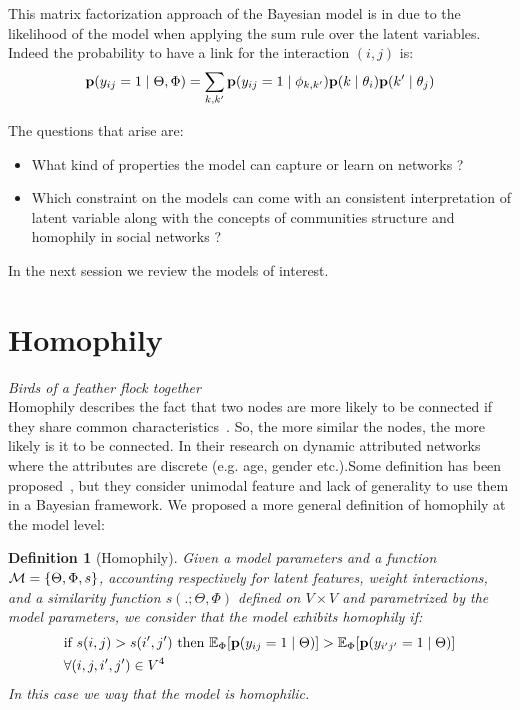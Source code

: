 \documentclass[a4paper, 12pt]{article}
\newtheorem{definition}{Definition}[section]
\begin{document}
This matrix factorization approach of the Bayesian model is in due to the likelihood of the model when applying the sum rule over the latent variables. Indeed the probability to have a link for the interaction $(i,j)$ is:
\begin{equation}
\mathbf{p}(y_{ij}=1 \mid \Theta, \Phi ) = \sum_{k, k'} \mathbf{p}(y_{ij}=1\mid\phi_{k,k'}) \mathbf{p}(k \mid\theta_i) \mathbf{p}(k' \mid \theta_j)
\end{equation}


The questions that arise are:
\begin{itemize}
	\item What kind of properties the model can capture or learn on networks ?
	\item Which constraint on the models can come with an consistent interpretation of latent variable along with the concepts of communities structure and homophily in social networks  ?
\end{itemize} 

In the next session we review the models of interest.

\section{Homophily}
\hspace{2em} \emph{Birds of a feather flock together} ~\\


Homophily describes the fact that two nodes are more likely to be connected if they share common characteristics~\cite{mcpherson2001birds,lazarsfeld1954friendship}. So, the more similar the nodes, the more likely is it to be connected. In their research on dynamic attributed networks where the attributes are discrete (e.g. age, gender etc.).Some definition has been proposed~\cite{la2010randomization}, but they consider unimodal feature and lack of generality to use them in a Bayesian framework. We proposed a more general definition of homophily at the model level:

\begin{definition}[Homophily]
	Given  a model parameters and a function $ \mathcal{M}=\{\Theta, \Phi, s\}$, accounting respectively for latent features, weight interactions, and a similarity function $s(. ;\Theta, \Phi)$ defined on $V\times V$ and parametrized by the model parameters, we consider that the model exhibits homophily if:
	\begin{align*}
	&\textnormal{if }  s(i,j) > s(i',j') \textnormal{ then } \mathbb{E}_\Phi[\mathbf{p}(y_{ij}=1 \mid \Theta)] > \mathbb{E}_\Phi[\mathbf{p}(y_{i'j'}=1  \mid \Theta)] \\
	&\forall (i,j,i',j') \in V^4 \nonumber 
	\end{align*}
In this case we way that the model is homophilic.
\end{definition}
\end{document}
